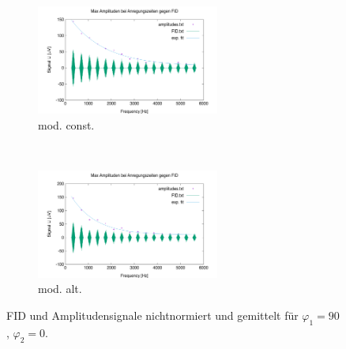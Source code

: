 \documentclass{article}
\begin{document}
        \begin{figure}[H]
            \centering
            \begin{subfigure}[b]{0.4\textwidth}
                \centering
                \includegraphics[width=6cm]{../Bilddateien/10/CPMG-90-0-constant-avg.png}
                \caption{mod. const.}
                \label{fig:CPMG-90-0-constant-avg}
            \end{subfigure}
            \
            \begin{subfigure}[b]{0.4\textwidth}
                \centering
                \includegraphics[width=6cm]{../Bilddateien/10/CPMG-90-0-alternating-avg.png}
                \caption{mod. alt.}
                \label{fig:CPMG-90-0-alternating-avg}
            \end{subfigure}
            \caption{FID und Amplitudensignale nichtnormiert und gemittelt für $\varphi_1 = 90$, $\varphi_2 = 0$.}
            \label{fig:CPMG-90-0-avg}
        \end{figure}
\end{document}
